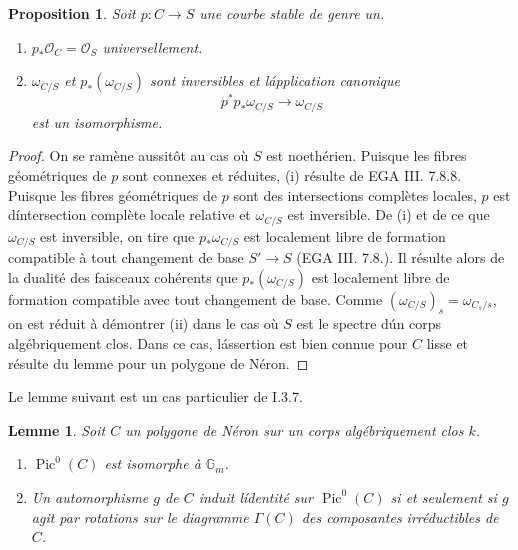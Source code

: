\documentclass{amsart}
\theoremstyle{plain}
\newtheorem{proposition}[theorem]{Proposition}
\newtheorem{lemma}[theorem]{Lemme}
\theoremstyle{remark}
\DeclareMathOperator{\Pic}{Pic}
\newcommand{\cO}{\mathcal{O}}
\newcommand{\bbG}{\mathbb{G}}
\begin{document}
\begin{proposition}
Soit $p: C \to S$ une courbe stable de genre un.
\begin{enumerate}
\item[(i)] $p_* \cO_C = \cO_S$ universellement.
\item[(ii)] $\omega_{C/S}$ et $p_*(\omega_{C/S})$ sont inversibles et l\'application canonique
\begin{equation}
p^* p_* \omega_{C/S} \to \omega_{C/S}
\end{equation}
est un isomorphisme.
\end{enumerate}
\end{proposition}

\begin{proof}
On se ram\`ene aussit\^ot au cas o\`u $S$ est noeth\'erien. Puisque les fibres
g\'eom\'etriques de $p$ sont connexes et r\'eduites, (i) r\'esulte de EGA III. 7.8.8.
Puisque les fibres g\'eom\'etriques de $p$ sont des intersections compl\`etes locales, $p$
est d\'intersection compl\`ete locale relative et $\omega_{C/S}$ est inversible. De (i) et de
ce que $\omega_{C/S}$ est inversible, on tire que $p_* \omega_{C/S}$ est localement libre de
formation compatible \`a tout changement de base $S' \to S$ (EGA III. 7.8.). Il r\'esulte
alors de la dualit\'e des faisceaux coh\'erents que $p_*(\omega_{C/S})$ est localement libre
de formation compatible avec tout changement de base. Comme
$(\omega_{C/S})_s = \omega_{C_s/s}$, on est r\'eduit \`a d\'emontrer (ii) dans le cas o\`u $S$
est le spectre d\'un corps alg\'ebriquement clos. Dans ce cas, l\'assertion est bien connue
pour $C$ lisse et r\'esulte du lemme pour un polygone de N\'eron.
\end{proof}

Le lemme suivant est un cas particulier de I.3.7.

\begin{lemma}
Soit $C$ un polygone de N\'eron sur un corps alg\'ebriquement clos $k$.
\begin{enumerate}
\item[(i)] $\Pic^0(C)$ est isomorphe \`a $\bbG_m$.
\item[(ii)] Un automorphisme $g$ de $C$ induit l\'identit\'e sur $\Pic^0(C)$ si et
seulement si $g$ agit par rotations sur le diagramme $\Gamma(C)$ des composantes
irr\'eductibles de $C$.
\end{enumerate}
\end{lemma}
\end{document}
